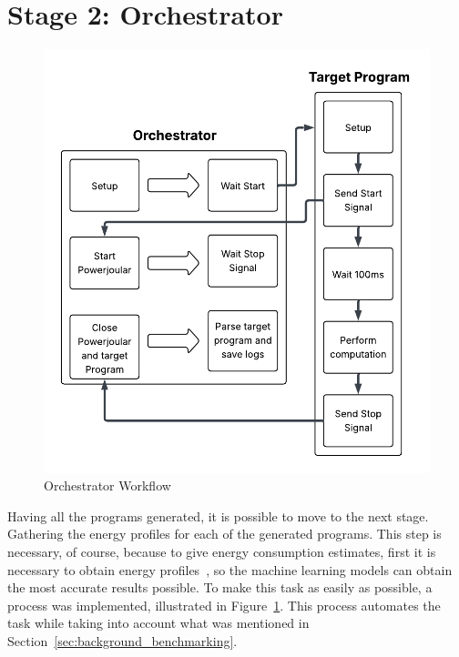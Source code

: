 

\section{Stage 2: Orchestrator} \label{sec:work_stage2_orchestrator}

\begin{figure}[htbp]
  \centering
  \includegraphics[scale = 0.7]{figures/orchestrators_process.pdf}
  \caption{Orchestrator Workflow}
  \label{fig:orchestrators_workflow}
\end{figure}


Having all the programs generated, it is possible to move to the next stage. Gathering the energy profiles for each of the generated programs. This step is necessary, of course, because to give energy consumption estimates, first it is necessary to obtain energy profiles~\cite{10.1145/2884781.2884869,8816747}, so the machine learning models can obtain the most accurate results possible. To make this task as easily as possible, a process was implemented, illustrated in Figure~\ref{fig:orchestrators_workflow}. This process automates the task while taking into account what was mentioned in Section~\ref{sec:background_benchmarking}.

